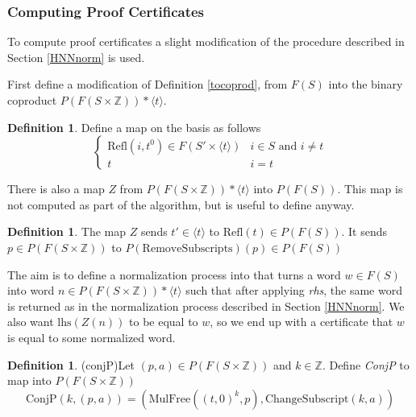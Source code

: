 \documentclass[11pt]{article} %
\theoremstyle{definition}
\theoremstyle{definition}
\theoremstyle{definition}
\theoremstyle{definition}
\theoremstyle{definition}
\newtheorem{defn}[theorem]{Definition}
\theoremstyle{definition}
\begin{document}
\subsubsection{Computing Proof Certificates}\label{HNNPC}

To compute proof certificates a slight modification of the procedure described in Section
\ref{HNNnorm} is used.

First define a modification of Definition \ref{tocoprod}, from $F(S)$ into the binary
coproduct $P(F(S \times \mathbb{Z})) \ast \langle t \rangle$.

\begin{defn}\label{tocoprodP}
  Define a map on the basis as follows
  \begin{equation}
    \begin{cases}
      \text{Refl}(i, t^0) \in F(S' \times \langle t \rangle) & i \in S \text{ and } i \ne t \\
      t & i = t
    \end{cases}
  \end{equation}
\end{defn}

There is also a map $Z$ from $P(F(S \times \mathbb{Z})) \ast \langle t \rangle$ into
$P(F(S))$. This map is not computed as part of the algorithm, but is useful to define anyway.

\begin{defn}
  The map $Z$ sends $t' \in \langle t \rangle$ to $\text{Refl}(t) \in P(F(S))$.
  It sends $p \in P(F(S \times \mathbb{Z}))$ to $P(\text{RemoveSubscripts})(p) \in P(F(S))$
\end{defn}

The aim is to define a normalization process into that turns a word $w \in F(S)$ into
word $n \in P(F(S \times \mathbb{Z})) \ast \langle t \rangle$
such that after applying \textit{rhs}, the same word is returned as in the
normalization process described in Section \ref{HNNnorm}. We also want
$\text{lhs}(Z(n))$ to be equal to $w$, so we end up with a certificate that $w$
is equal to some normalized word.

\begin{defn}(conjP)\label{conjP}
  Let $(p, a) \in P(F(S \times \mathbb{Z}))$ and $k \in \mathbb{Z}$.
  Define \textit{ConjP} to map into $P(F(S \times \mathbb{Z}))$
  \begin{equation}
    \text{ConjP}(k, (p, a)) = (\text{MulFree}((t,0)^k, p), \text{ChangeSubscript}(k, a))
  \end{equation}
\end{defn}
\end{document}
